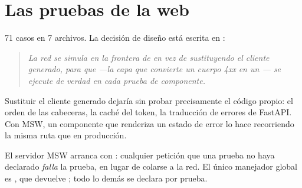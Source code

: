 \section{Las pruebas de la web}

71 casos en 7 archivos. La decisión de diseño está escrita en
:

\begin{quote}\small\itshape
La red se simula en la frontera de  en vez de sustituyendo el
cliente generado, para que  —la capa que convierte un cuerpo
4xx en un — se ejecute de verdad en cada prueba de componente.
\end{quote}

Sustituir el cliente generado dejaría sin probar precisamente el código propio:
el orden de las cabeceras, la caché del token, la traducción de errores de
FastAPI. Con MSW, un componente que renderiza un estado de error lo hace
recorriendo la misma ruta que en producción.

El servidor MSW arranca con : cualquier
petición que una prueba no haya declarado \emph{falla} la prueba, en lugar de
colarse a la red. El único manejador global es
, que devuelve ; todo lo demás
se declara por prueba.

